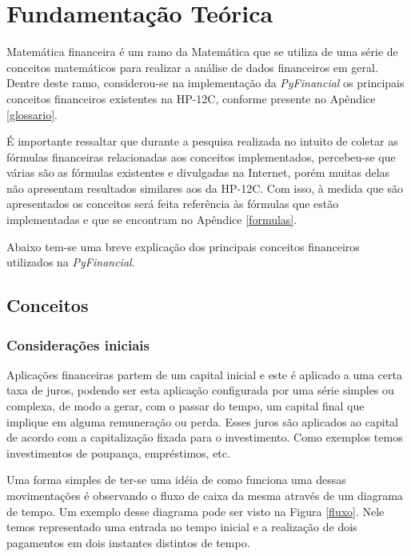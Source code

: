\chapter{Fundamentação Teórica}

Matemática financeira é um ramo da Matemática que se utiliza de uma série de conceitos matemáticos para realizar a análise de dados financeiros em geral. Dentre deste ramo,  considerou-se na implementação da \textit{PyFinancial} os principais conceitos financeiros existentes na HP-12C, conforme presente no Apêndice \ref{glossario}.

É importante ressaltar que durante a pesquisa realizada no intuito de coletar as fórmulas financeiras relacionadas aos conceitos implementados, percebeu-se que várias são as fórmulas existentes e divulgadas na Internet, porém muitas delas não apresentam resultados similares aos da HP-12C. Com isso, à medida que são apresentados os conceitos será feita referência às fórmulas que estão implementadas e que se encontram no Apêndice \ref{formulas}.

Abaixo tem-se uma breve explicação dos principais conceitos financeiros utilizados na \textit{PyFinancial}.

\section{Conceitos}

\subsection{Considerações iniciais}

Aplicações financeiras partem de um capital inicial e este é aplicado a uma certa taxa de juros, podendo ser esta aplicação configurada por uma série simples ou complexa, de modo a gerar, com o passar do tempo, um capital final que implique em alguma remuneração ou perda. Esses juros são aplicados ao capital de acordo com a capitalização fixada para o investimento. Como exemplos temos investimentos de poupança, empréstimos, etc.

Uma forma simples de ter-se uma idéia de como funciona uma dessas movimentações é observando o fluxo de caixa da mesma através de um diagrama de tempo. Um exemplo desse diagrama pode ser visto na Figura \ref{fluxo}. Nele temos representado uma entrada no tempo inicial e a realização de dois pagamentos em dois instantes distintos de tempo.

